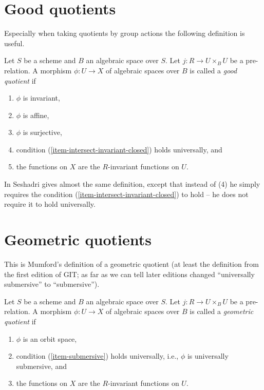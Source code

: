 \section{Good quotients}
\label{section-good}

\noindent
Especially when taking quotients by group actions the following definition
is useful.

\begin{definition}
\label{definition-good}
Let $S$ be a scheme and $B$ an algebraic space over $S$.
Let $j : R \to U \times_B U$ be a pre-relation.
A morphism $\phi : U \to X$ of algebraic spaces over $B$
is called a {\it good quotient} if
\begin{enumerate}
\item $\phi$ is invariant,
\item $\phi$ is affine,
\item $\phi$ is surjective,
\item condition (\ref{item-intersect-invariant-closed}) holds universally, and
\item the functions on $X$ are the $R$-invariant functions on $U$.
\end{enumerate}
\end{definition}

\noindent
In \cite{seshadri_quotients} Seshadri gives almost the same definition,
except that instead of (4) he simply requires the condition
(\ref{item-intersect-invariant-closed}) to hold -- he does not require
it to hold universally.







\section{Geometric quotients}
\label{section-geometric}

\noindent
This is Mumford's definition of a geometric quotient (at least the definition
from the first edition of GIT; as far as we can tell later editions
changed ``universally submersive'' to ``submersive'').

\begin{definition}
\label{definition-geometric}
Let $S$ be a scheme and $B$ an algebraic space over $S$.
Let $j : R \to U \times_B U$ be a pre-relation.
A morphism $\phi : U \to X$ of algebraic spaces over $B$
is called a {\it geometric quotient} if
\begin{enumerate}
\item $\phi$ is an orbit space,
\item condition (\ref{item-submersive}) holds universally, i.e.,
$\phi$ is universally submersive, and
\item the functions on $X$ are the $R$-invariant functions on $U$.
\end{enumerate}
\end{definition}
















